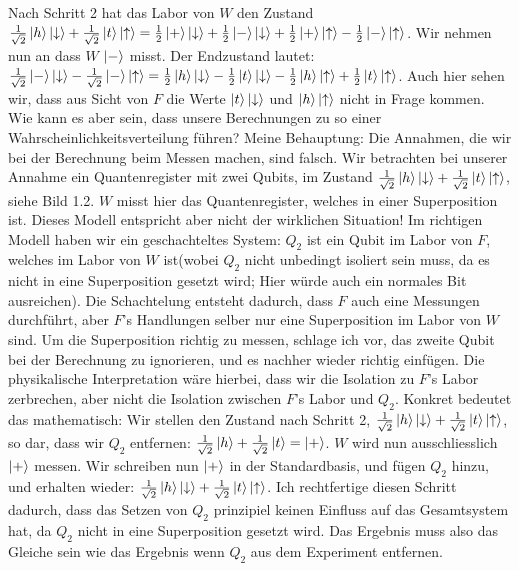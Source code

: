 \documentclass[a4paper]{article}
\begin{document}
Nach Schritt 2 hat das Labor von $W$ den Zustand $\frac{1}{\sqrt{2}} \ket{h}\ket{\downarrow} + \frac{1}{\sqrt{2}} \ket{t}\ket{\uparrow} = \frac{1}{2}\ket{+}\ket{\downarrow} + \frac{1}{2}\ket{-}\ket{\downarrow} + \frac{1}{2}\ket{+}\ket{\uparrow} - \frac{1}{2}\ket{-}\ket{\uparrow}$. Wir nehmen nun an dass $W$ $\ket{-}$ misst. Der Endzustand lautet: $\frac{1}{\sqrt{2}} \ket{-}\ket{\downarrow} - \frac{1}{\sqrt{2}} \ket{-}\ket{\uparrow} = \frac{1}{2}\ket{h}\ket{\downarrow} - \frac{1}{2}\ket{t}\ket{\downarrow} - \frac{1}{2}\ket{h}\ket{\uparrow} + \frac{1}{2}\ket{t}\ket{\uparrow}$. Auch hier sehen wir, dass aus Sicht von $F$ die Werte $\ket{t}\ket{\downarrow}$ und $\ket{h}\ket{\uparrow}$ nicht in Frage kommen. Wie kann es aber sein, dass unsere Berechnungen zu so einer Wahrscheinlichkeitsverteilung führen? Meine Behauptung: Die Annahmen, die wir bei der Berechnung beim Messen machen, sind falsch. Wir betrachten bei unserer Annahme ein Quantenregister mit zwei Qubits, im Zustand $\frac{1}{\sqrt{2}} \ket{h}\ket{\downarrow} + \frac{1}{\sqrt{2}} \ket{t}\ket{\uparrow}$, siehe Bild 1.2. $W$ misst hier das Quantenregister, welches in einer Superposition ist. Dieses Modell entspricht aber nicht der wirklichen Situation! Im richtigen Modell haben wir ein geschachteltes System: $Q_2$ ist ein Qubit im Labor von $F$, welches im Labor von $W$ ist(wobei $Q_2$ nicht unbedingt isoliert sein muss, da es nicht in eine Superposition gesetzt wird; Hier würde auch ein normales Bit ausreichen). Die Schachtelung entsteht dadurch, dass $F$ auch eine Messungen durchführt, aber $F$'s Handlungen selber nur eine Superposition im Labor von $W$ sind. Um die Superposition richtig zu messen, schlage ich vor, das zweite Qubit bei der Berechnung zu ignorieren, und es nachher wieder richtig einfügen. Die physikalische Interpretation wäre hierbei, dass wir die Isolation zu $F$'s Labor zerbrechen, aber nicht die Isolation zwischen $F$'s Labor und $Q_2$. Konkret bedeutet das mathematisch: Wir stellen den Zustand nach Schritt 2, $\frac{1}{\sqrt{2}} \ket{h}\ket{\downarrow} + \frac{1}{\sqrt{2}} \ket{t}\ket{\uparrow}$, so dar, dass wir $Q_2$ entfernen: $\frac{1}{\sqrt{2}} \ket{h} + \frac{1}{\sqrt{2}} \ket{t} = \ket{+}$. $W$ wird nun ausschliesslich $\ket{+}$ messen. Wir  schreiben nun $\ket{+}$ in der Standardbasis, und fügen $Q_2$ hinzu, und erhalten wieder: $\frac{1}{\sqrt{2}} \ket{h}\ket{\downarrow} + \frac{1}{\sqrt{2}} \ket{t}\ket{\uparrow}$. Ich rechtfertige diesen Schritt dadurch, dass das Setzen von $Q_2$ prinzipiel keinen Einfluss auf das Gesamtsystem hat, da $Q_2$ nicht in eine Superposition gesetzt wird. Das Ergebnis muss also das Gleiche sein wie das Ergebnis wenn $Q_2$ aus dem Experiment entfernen.
\end{document}
